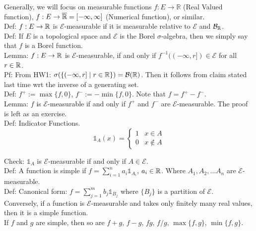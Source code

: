 \documentclass[english, 11pt]{article}
\begin{document}
Generally, we will focus on measurable functions $f: E \to \mathbb{R}$ (Real Valued function), $f: E \to \overline{{\mathbb{R}}} = [-\infty, \infty]$ (Numerical function), or similar.\\

Def: $f: E \to {\mathbb{R}}$ is $\mathcal{E}$-measurable if it is measurable relative to $\mathcal{E}$ and $\mathcal{B}_{\mathbb{R}}$.\\

Def: If $E$ is a topological space and $\mathcal{E}$ is the Borel $\sigma$-algebra, then we simply say that $f$ is a Borel function.\\

Lemma: $f: E \to {\mathbb{R}}$ is $\mathcal{E}$-measurable, if and only if $f^{-1}((-\infty, r]) \in \mathcal{E}$ for all $r \in {\mathbb{R}}$.\\

Pf: From HW1: $\sigma(\{(-\infty, r] \mid r \in {\mathbb{R}}\}) = \mathcal{B}({\mathbb{R}})$. Then it follows from claim stated last time wrt the inverse of a generating set.\\

Def: $f^+:= \max\{f, 0\}$, $f^-:= -\min\{f, 0\}$. Note that $f = f^+ - f^-$.\\

Lemma: $f$ is $\mathcal{E}$-measurable if and only if $f^+$ and $f^-$ are $\mathcal{E}$-measurable. The proof is left as an exercise.\\

Def: Indicator Functions.
\[\mathbb{1}_A(x) =
\begin{cases}
1 & x \in A\\
0 & x \not \in A
\end{cases}\]

Check: $\mathbb{1}_A$ is $\mathcal{E}$-measurable if and only if $A \in \mathcal{E}$.\\

Def: A function is simple if $f = \sum_{i = 1}^n a_i \mathbb{1}_{A_i}$, $a_i \in {\mathbb{R}}$. Where $A_1, A_2, \dots A_n$ are $\mathcal{E}$-measurable.\\

Def: Canonical form: $f = \sum_{j = 1}^m b_j \mathbb{1}_{B_j}$ where $\{B_j\}$ is a partition of $\mathcal{E}$.\\

Conversely, if a function is $\mathcal{E}$-measurable and takes only finitely many real values, then it is a simple function.\\

If $f$ and $g$ are simple, then so are $f+g$, $f-g$, $fg$, $f/g$, $\max\{f, g\}$, $\min\{f, g\}$.\\
\end{document}

